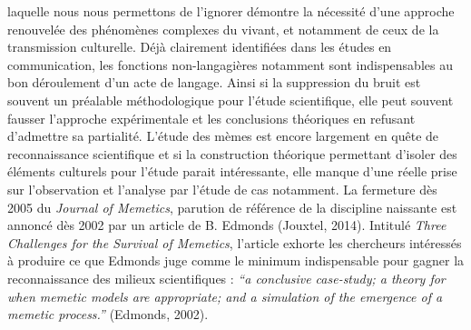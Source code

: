 laquelle nous nous permettons de l{\textquoteright}ignorer d\'emontre la n\'ecessit\'e d{\textquoteright}une approche renouvel\'ee des ph\'enom\`enes complexes du vivant, et notamment de ceux de la transmission culturelle. D\'ej\`a clairement identifi\'ees dans les \'etudes en communication, les fonctions non-langagi\`eres notamment sont indispensables au bon d\'eroulement d{\textquoteright}un acte de langage. Ainsi si la suppression du bruit est souvent un pr\'ealable m\'ethodologique pour l{\textquoteright}\'etude scientifique, elle peut souvent fausser l{\textquoteright}approche exp\'erimentale et les conclusions th\'eoriques en refusant d{\textquoteright}admettre sa partialit\'e. L{\textquoteright}\'etude des m\`emes est encore largement en qu\^ete de reconnaissance scientifique et si la construction th\'eorique permettant d{\textquoteright}isoler des \'el\'ements culturels pour l{\textquoteright}\'etude parait int\'eressante, elle manque d{\textquoteright}une r\'eelle prise sur l{\textquoteright}observation et l{\textquoteright}analyse par l{\textquoteright}\'etude de cas notamment. La fermeture d\`es 2005 du \textit{Journal of Memetics}, parution de r\'ef\'erence de la discipline naissante est annonc\'e d\`es 2002 par un article de B. Edmonds (Jouxtel, 2014). Intitul\'e \textit{Three Challenges for the Survival of Memetics}, l{\textquoteright}article\textit{ }exhorte les chercheurs int\'eress\'es \`a produire ce que Edmonds juge comme le minimum indispensable pour gagner la reconnaissance des milieux scientifiques : \textit{{\textquotedblleft}a conclusive case-study; a theory for when memetic models are appropriate; and a simulation of the emergence of a memetic process.{\textquotedblright}} (Edmonds, 2002).  
